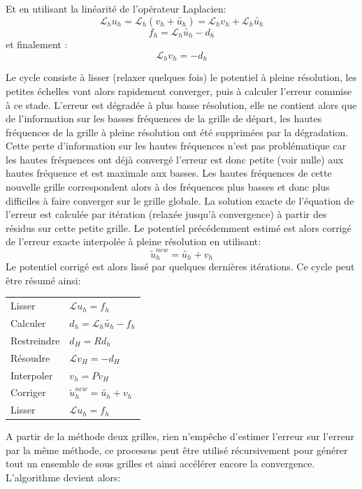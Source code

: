 Et en utilisant la linéarité de l'opérateur Laplacien:
\[ \mathcal{L}_h u_h = \mathcal{L}_h (v_h + \tilde{u_h} ) = \mathcal{L}_h v_h +\mathcal{L}_h \tilde{u_h} \]
\[ f_h   = \mathcal{L}_h \tilde{u_h} - d_h\]
et finalement :
\[ \mathcal{L}_h v_h = -d_h \]

Le cycle consiste à lisser (relaxer quelques fois) le potentiel à pleine résolution, les petites échelles vont alors rapidement converger, puis à calculer l'erreur commise à ce stade. 
L'erreur est dégradée à plus basse résolution, elle ne contient alors que de l'information sur les basses fréquences de la grille de départ, les hautes fréquences de la grille à pleine résolution ont été supprimées par la dégradation. 
Cette perte d'information sur les hautes fréquences n'est pas problématique car les hautes fréquences ont déjà convergé l'erreur est donc petite (voir nulle) aux hautes fréquence et est maximale aux basses. 
Les hautes fréquences de cette nouvelle grille correspondent alors à des fréquences plus basses et donc plus difficiles à faire converger sur le grille globale. 
La solution exacte de l'équation de l'erreur est calculée par itération (relaxée jusqu'à convergence) à partir des résidus sur cette petite grille. 
Le potentiel précédemment estimé est alors corrigé de l'erreur exacte interpolée à pleine résolution en utilisant:
\[ \tilde{u}_h^{new} = \tilde{u_h} + v_h \]
Le potentiel corrigé est alors lissé par quelques dernières itérations.
Ce cycle peut être résumé ainsi:

\begin{tabular}{ll}
Lisser 		& 	$ \mathcal{L} u_h = f_h $\\
Calculer	&	$ d_h = \mathcal{L}_h \tilde{u_h} - f_h $\\
Restreindre	&	$ d_H = Rd_h$\\
Résoudre	&	$ \mathcal{L} v_H = -d_H $\\
Interpoler	&	$ v_h = Pv_H$\\
Corriger	&	$ \tilde{u}_h^{new} = \tilde{u_h} + v_h$\\
Lisser		&	$ \mathcal{L} u_h = f_h $
\end{tabular} 

A partir de la méthode deux grilles, rien n'empêche d'estimer l'erreur sur l'erreur par la même méthode, ce processus peut être utilisé récursivement pour générer tout un ensemble de sous grilles et ainsi accélérer encore la convergence.
L'algorithme devient alors:


